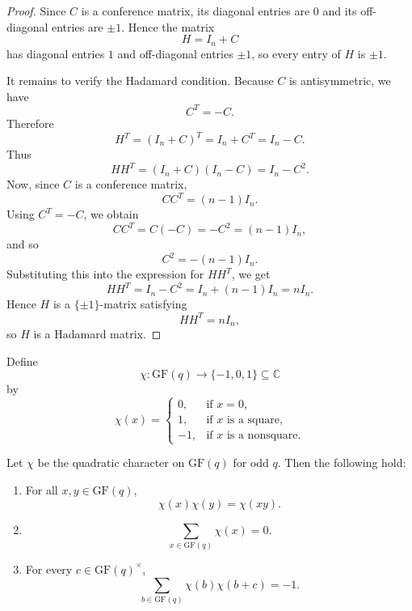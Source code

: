 \documentclass[11pt, a4paper]{ctexrep}
\begin{document}
\begin{proof}
    Since $C$ is a conference matrix, its diagonal entries are $0$ and its off-diagonal
    entries are $\pm 1$. Hence the matrix
    \[
        H=I_n+C
    \]
    has diagonal entries $1$ and off-diagonal entries $\pm 1$, so every entry of $H$
    is $\pm 1$.

    It remains to verify the Hadamard condition. Because $C$ is antisymmetric, we have
    \[
        C^T=-C.
    \]
    Therefore
    \[
        H^T=(I_n+C)^T=I_n+C^T=I_n-C.
    \]
    Thus
    \[
        HH^T=(I_n+C)(I_n-C)=I_n-C^2.
    \]
    Now, since $C$ is a conference matrix,
    \[
        CC^T=(n-1)I_n.
    \]
    Using $C^T=-C$, we obtain
    \[
        CC^T=C(-C)=-C^2=(n-1)I_n,
    \]
    and so
    \[
        C^2=-(n-1)I_n.
    \]
    Substituting this into the expression for $HH^T$, we get
    \[
        HH^T=I_n-C^2=I_n+(n-1)I_n=nI_n.
    \]
    Hence $H$ is a $\{\pm1\}$-matrix satisfying
    \[
        HH^T=nI_n,
    \]
    so $H$ is a Hadamard matrix.
\end{proof}

\begin{definition}
    Define
    \[
        \chi:\mathrm{GF}(q)\to\{-1,0,1\}\subseteq \mathbb{C}
    \]
    by
    \[
        \chi(x)=
        \begin{cases}
            0,  & \text{if } x=0,                      \\
            1,  & \text{if } x \text{ is a square},    \\
            -1, & \text{if } x \text{ is a nonsquare}.
        \end{cases}
    \]
\end{definition}

\begin{proposition}\label{hx2ueq}
    Let $\chi$ be the quadratic character on $\mathrm{GF}(q)$ for odd $q$. Then the following hold:
    \begin{enumerate}
        \item For all $x,y\in \mathrm{GF}(q)$,
              \[
                  \chi(x)\chi(y)=\chi(xy).
              \]
        \item
              \[
                  \sum_{x\in \mathrm{GF}(q)} \chi(x)=0.
              \]
        \item For every $c\in \mathrm{GF}(q)^\times$,
              \[
                  \sum_{b\in \mathrm{GF}(q)} \chi(b)\chi(b+c)=-1.
              \]
    \end{enumerate}
\end{proposition}
\end{document}
